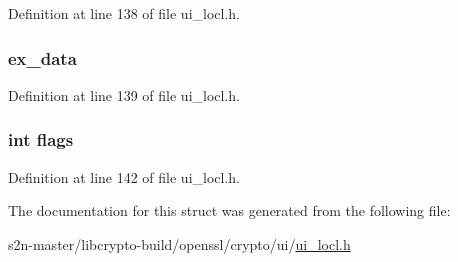 Definition at line 138 of file ui\+\_\+locl.\+h.

\subsubsection[{\texorpdfstring{ex\+\_\+data}{ex_data}}]{ ex\+\_\+data}\hypertarget{structui__st_ac3e4fd59d6ee44a81f3a58114613c1e2}{}\label{structui__st_ac3e4fd59d6ee44a81f3a58114613c1e2}


Definition at line 139 of file ui\+\_\+locl.\+h.

\subsubsection[{\texorpdfstring{flags}{flags}}]{\setlength{\rightskip}{0pt plus 5cm}int flags}\hypertarget{structui__st_ac8bf36fe0577cba66bccda3a6f7e80a4}{}\label{structui__st_ac8bf36fe0577cba66bccda3a6f7e80a4}


Definition at line 142 of file ui\+\_\+locl.\+h.



The documentation for this struct was generated from the following file\+:\begin{DoxyCompactItemize}
\item 
s2n-\/master/libcrypto-\/build/openssl/crypto/ui/\hyperlink{ui__locl_8h}{ui\+\_\+locl.\+h}\end{DoxyCompactItemize}
